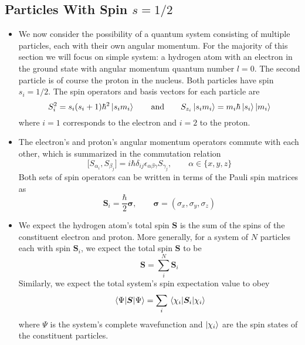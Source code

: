 \documentclass[11pt, a4paper]{article}
\newcommand{\eqtext}[1]{\qquad \text{#1} \qquad}
\renewcommand{\vec}[1]{\bm{#1}}  %
\renewcommand{\S}{\vec{S}}  %
\renewcommand{\P}{\Psi}  %
\begin{document}
\subsection{Particles With Spin $ s = 1/2 $}
\begin{itemize}
	\item We now consider the possibility of a quantum system consisting of multiple particles, each with their own angular momentum. For the majority of this section we will focus on simple system: a hydrogen atom with an electron in the ground state with angular momentum quantum number $ l = 0 $. The second particle is of course the proton in the nucleus. Both particles have spin $ s_{i} = 1/2 $. The spin operators and basis vectors for each particle are
	\begin{equation*}
		S_{i}^{2} = s_{i}(s_{i} + 1)\hbar^{2}\ket{s_{i}m_{i}} \eqtext{and} S_{z_{i}}\ket{s_{i}m_{i}} = m_{i}\hbar \ket{s_{i}}\ket{m_{i}}
	\end{equation*}
	where $ i = 1 $ corresponds to the electron and $ i = 2 $ to the proton. 
	
	\item The electron's and proton's angular momentum operators commute with each other, which is summarized in the commutation relation
	\begin{equation*}
		\big[S_{\alpha_{i}}, S_{\beta_{j}}\big] = i \hbar \delta_{ij}\epsilon_{\alpha \beta \gamma}S_{\gamma_{j}}, \qquad \alpha \in \{x, y, z\}
	\end{equation*}
	Both sets of spin operators can be written in terms of the Pauli spin matrices as
	\begin{equation*}
		\vec{S}_{i} = \frac{\hbar}{2}\vec{\sigma}, \qquad \vec{\sigma} = \left(\sigma_{x}, \sigma_{y}, \sigma_{z}\right)
	\end{equation*}
	
	\item We expect the hydrogen atom's total spin $ \vec{S} $ is the sum of the spins of the constituent electron and proton. More generally, for a system of $ N $ particles each with spin $ \S_{i} $, we expect the total spin $ \S $ to be
	\begin{equation*}
		\S = \sum_{i}^{N}\S_{i}
	\end{equation*}
	Similarly, we expect the total system's spin expectation value to obey
	\begin{equation*}
		\mel{\P}{\S}{\P} = \sum_{i}\mel{\chi_{i}}{\S_{i}}{\chi_{i}}
	\end{equation*}
	where $ \P $ is the system's complete wavefunction and $ \ket{\chi_{i}} $ are the spin states of the constituent particles. 
	

\end{itemize}
\end{document}
